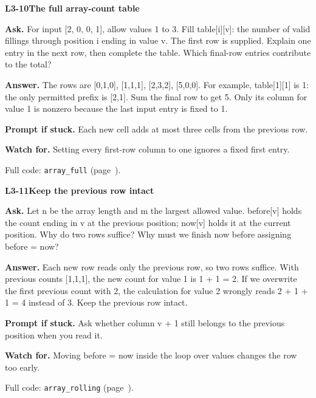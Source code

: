 \documentclass[11pt,a4paper]{article}
\begin{document}
\noindent\begin{minipage}{\textwidth}
{\color{teal}\textbf{L3-10}}\quad \textbf{The full array-count table}\par\smallskip
\textbf{Ask.} For input [2, 0, 0, 1], allow values 1 to 3. Fill table[i][v]: the number of valid fillings through position i ending in value v. The first row is supplied. Explain one entry in the next row, then complete the table. Which final-row entries contribute to the total?\par\smallskip
\textbf{Answer.} The rows are [0,1,0], [1,1,1], [2,3,2], [5,0,0]. For example, table[1][1] is 1: the only permitted prefix is [2,1]. Sum the final row to get 5. Only its column for value 1 is nonzero because the last input entry is fixed to 1.\par\smallskip
\textbf{Prompt if stuck.} Each new cell adds at most three cells from the previous row.\par\smallskip
\textbf{Watch for.} Setting every first-row column to one ignores a fixed first entry.\par\smallskip Full code: \texttt{array\_full} (page~\pageref{L3-code-array_full}).
\end{minipage}\par{}\medskip

\noindent\begin{minipage}{\textwidth}
{\color{teal}\textbf{L3-11}}\quad \textbf{Keep the previous row intact}\par\smallskip
\textbf{Ask.} Let n be the array length and m the largest allowed value. before[v] holds the count ending in v at the previous position; now[v] holds it at the current position. Why do two rows suffice? Why must we finish now before assigning before = now?\par\smallskip
\textbf{Answer.} Each new row reads only the previous row, so two rows suffice. With previous counts [1,1,1], the new count for value 1 is 1 + 1 = 2. If we overwrite the first previous count with 2, the calculation for value 2 wrongly reads 2 + 1 + 1 = 4 instead of 3. Keep the previous row intact.\par\smallskip
\textbf{Prompt if stuck.} Ask whether column v + 1 still belongs to the previous position when you read it.\par\smallskip
\textbf{Watch for.} Moving before = now inside the loop over values changes the row too early.\par\smallskip Full code: \texttt{array\_rolling} (page~\pageref{L3-code-array_rolling}).
\end{minipage}\par{}\medskip
\end{document}
